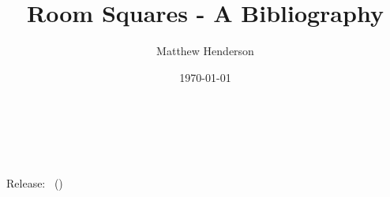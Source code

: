\documentclass[a4paper, 11pt]{article}
\title{Room Squares - A Bibliography}
\author{Matthew Henderson}
\date{\today}
\begin{document}
\makeatletter
  \begin{titlepage}
    \begin{center}
      {\huge \bfseries  \@title } \\[2ex]
      {\LARGE  \@author} \\[50ex]
      {\large \@date} \\[4ex]
      {Release: \gitReln\ (\gitAbbrevHash)}
    \end{center}
  \end{titlepage}
\makeatother
\thispagestyle{empty}
\newpage

\nocite{*}

\printbibliography[heading=none]
\end{document}
